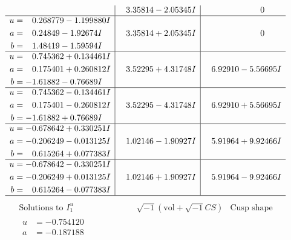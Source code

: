 \documentclass[1p]{elsarticle_modified}
\theoremstyle{definition}
\newcommand{\I}{\sqrt{-1}}
\begin{document}
$$\begin{array}{c|c|c}
 & \phantom{-}3.35814 - 2.05345 I & \phantom{-0.000000 } 0 \\ \hline\begin{aligned}
u &= \phantom{-}0.268779 - 1.199880 I \\
a &= \phantom{-}0.24849 - 1.92674 I \\
b &= \phantom{-}1.48419 - 1.59594 I\end{aligned}
 & \phantom{-}3.35814 + 2.05345 I & \phantom{-0.000000 } 0 \\ \hline\begin{aligned}
u &= \phantom{-}0.745362 + 0.134461 I \\
a &= \phantom{-}0.175401 + 0.260812 I \\
b &= -1.61882 - 0.76689 I\end{aligned}
 & \phantom{-}3.52295 + 4.31748 I & \phantom{-}6.92910 - 5.56695 I \\ \hline\begin{aligned}
u &= \phantom{-}0.745362 - 0.134461 I \\
a &= \phantom{-}0.175401 - 0.260812 I \\
b &= -1.61882 + 0.76689 I\end{aligned}
 & \phantom{-}3.52295 - 4.31748 I & \phantom{-}6.92910 + 5.56695 I \\ \hline\begin{aligned}
u &= -0.678642 + 0.330251 I \\
a &= -0.206249 - 0.013125 I \\
b &= \phantom{-}0.615264 + 0.077383 I\end{aligned}
 & \phantom{-}1.02146 - 1.90927 I & \phantom{-}5.91964 + 9.92466 I \\ \hline\begin{aligned}
u &= -0.678642 - 0.330251 I \\
a &= -0.206249 + 0.013125 I \\
b &= \phantom{-}0.615264 - 0.077383 I\end{aligned}
 & \phantom{-}1.02146 + 1.90927 I & \phantom{-}5.91964 - 9.92466 I\\
 \hline 
 \end{array}$$\newpage$$\begin{array}{c|c|c}  
\text{Solutions to }I^u_{1}& \I (\text{vol} + \sqrt{-1}CS) & \text{Cusp shape}\\
 \hline 
\begin{aligned}
u &= -0.754120\phantom{ +0.000000I} \\
a &= -0.187188\phantom{ +0.000000I} \\

\end{aligned}
\end{array}$$
\end{document}
